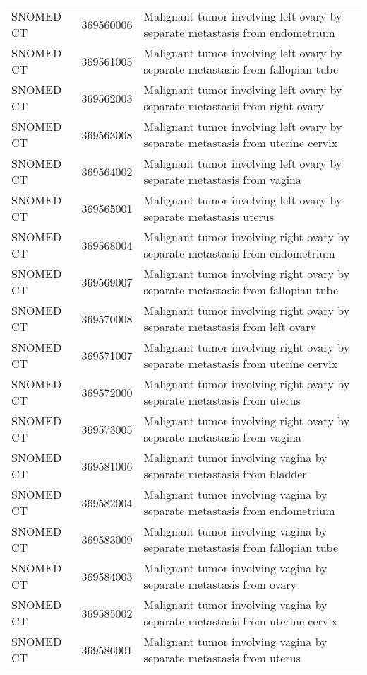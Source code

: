 \begin{longtable}{p{}p{}p{}}
  SNOMED CT & 369560006 & Malignant tumor involving left ovary by separate metastasis from endometrium \\ 
  SNOMED CT & 369561005 & Malignant tumor involving left ovary by separate metastasis from fallopian tube \\ 
  SNOMED CT & 369562003 & Malignant tumor involving left ovary by separate metastasis from right ovary \\ 
  SNOMED CT & 369563008 & Malignant tumor involving left ovary by separate metastasis from uterine cervix \\ 
  SNOMED CT & 369564002 & Malignant tumor involving left ovary by separate metastasis from vagina \\ 
  SNOMED CT & 369565001 & Malignant tumor involving left ovary by separate metastasis uterus \\ 
  SNOMED CT & 369568004 & Malignant tumor involving right ovary by separate metastasis from endometrium \\ 
  SNOMED CT & 369569007 & Malignant tumor involving right ovary by separate metastasis from fallopian tube \\ 
  SNOMED CT & 369570008 & Malignant tumor involving right ovary by separate metastasis from left ovary \\ 
  SNOMED CT & 369571007 & Malignant tumor involving right ovary by separate metastasis from uterine cervix \\ 
  SNOMED CT & 369572000 & Malignant tumor involving right ovary by separate metastasis from uterus \\ 
  SNOMED CT & 369573005 & Malignant tumor involving right ovary by separate metastasis from vagina \\ 
  SNOMED CT & 369581006 & Malignant tumor involving vagina by separate metastasis from bladder \\ 
  SNOMED CT & 369582004 & Malignant tumor involving vagina by separate metastasis from endometrium \\ 
  SNOMED CT & 369583009 & Malignant tumor involving vagina by separate metastasis from fallopian tube \\ 
  SNOMED CT & 369584003 & Malignant tumor involving vagina by separate metastasis from ovary \\ 
  SNOMED CT & 369585002 & Malignant tumor involving vagina by separate metastasis from uterine cervix \\ 
  SNOMED CT & 369586001 & Malignant tumor involving vagina by separate metastasis from uterus \\ 

\end{longtable}
